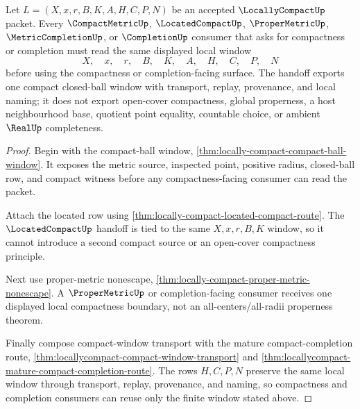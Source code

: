 \begin{theorem}
\label{thm:locally-compact-compact-window-handoff}
Let $L=(X,x,r,B,K,A,H,C,P,N)$ be an accepted $\LocallyCompactUp$ packet. Every $\CompactMetricUp$, $\LocatedCompactUp$, $\ProperMetricUp$, $\MetricCompletionUp$, or $\CompletionUp$ consumer that asks for compactness or completion must read the same displayed local window
$$
X,\quad x,\quad r,\quad B,\quad K,\quad A,\quad H,\quad C,\quad P,\quad N
$$
before using the compactness or completion-facing surface. The handoff exports one compact closed-ball window with transport, replay, provenance, and local naming; it does not export open-cover compactness, global properness, a host neighbourhood base, quotient point equality, countable choice, or ambient $\RealUp$ completeness.
\end{theorem}
\begin{proof}
Begin with the compact-ball window, \autoref{thm:locally-compact-compact-ball-window}. It exposes the metric source, inspected point, positive radius, closed-ball row, and compact witness before any compactness-facing consumer can read the packet.

Attach the located row using \autoref{thm:locally-compact-located-compact-route}. The $\LocatedCompactUp$ handoff is tied to the same $X,x,r,B,K$ window, so it cannot introduce a second compact source or an open-cover compactness principle.

Next use proper-metric nonescape, \autoref{thm:locally-compact-proper-metric-nonescape}. A $\ProperMetricUp$ or completion-facing consumer receives one displayed local compactness boundary, not an all-centers/all-radii properness theorem.

Finally compose compact-window transport with the mature compact-completion route, \autoref{thm:locallycompact-compact-window-transport} and \autoref{thm:locallycompact-mature-compact-completion-route}. The rows $H,C,P,N$ preserve the same local window through transport, replay, provenance, and naming, so compactness and completion consumers can reuse only the finite window stated above.
\end{proof}


